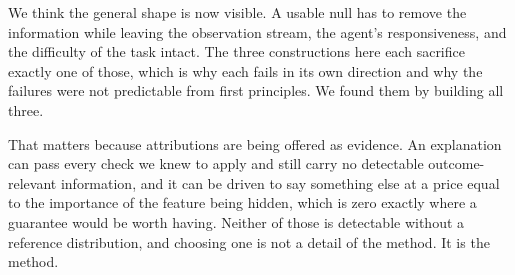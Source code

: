 \documentclass[10pt,twocolumn]{article}
\begin{document}
We think the general shape is now visible. A usable null has to remove the
information while leaving the observation stream, the agent's responsiveness,
and the difficulty of the task intact. The three constructions here each
sacrifice exactly one of those, which is why each fails in its own direction and
why the failures were not predictable from first principles. We found them by
building all three.

That matters because attributions are being offered as evidence. An explanation
can pass every check we knew to apply and still carry no detectable
outcome-relevant information, and it can be driven to say
something else at a price equal to the importance of the feature being hidden,
which is zero exactly where a guarantee would be worth having. Neither of those
is detectable without a reference distribution, and choosing one is not a
detail of the method. It is the method.



\end{document}
